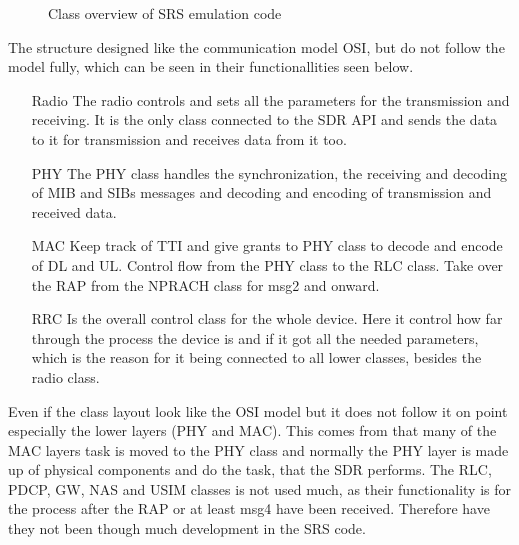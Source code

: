 
\begin{figure}[H]
\centering
\resizebox{0.5\textwidth}{!}{
}
\caption{Class overview of SRS emulation code}
\label{fig:MassClass}
\end{figure}

The structure designed like the communication model OSI, but do not follow the model fully, which can be seen in their functionallities seen below.

\begin{itemize}
\item [Radio] The radio controls and sets all the parameters for the transmission and receiving. It is the only class connected to the SDR API and sends the data to it for transmission and receives data from it too. 
\item [PHY] The PHY class handles the synchronization, the receiving and decoding of MIB and SIBs messages and decoding and encoding of transmission and received data.
\item [MAC] Keep track of TTI and give grants to PHY class to decode and encode of DL and UL. Control flow from the PHY class to the RLC class. Take over the RAP from the NPRACH class for msg2 and onward.
\item [RRC] Is the overall control class for the whole device. Here it control how far through the process the device is and if it got all the needed parameters, which is the reason for it being connected to all lower classes, besides the radio class.
\end{itemize}

Even if the class layout look like the OSI model but it does not follow it on point especially the lower layers (PHY and MAC). This comes from that many of the MAC layers task is moved to the PHY class and normally the PHY layer is made up of physical components and do the task, that the SDR performs. The RLC, PDCP, GW, NAS and USIM classes is not used much, as their functionality is for the process after the RAP or at least msg4 have been received. Therefore have they not been though much development in the SRS code.

